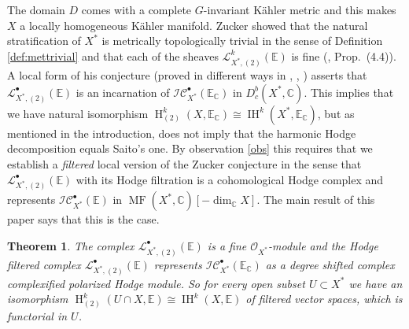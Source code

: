 \documentclass[12pt,letterpaper]{amsart}
\numberwithin{equation}{section}
\def\CC{{\mathbb C}}
\def\EE{{\mathbb E}}
\def\Iscr{{\mathscr I}}
\def\Lscr{{\mathscr L}}
\def\Ocal{{\mathcal O}}
\def\Cscr{{\mathscr C}}
\def\pt{{\scriptscriptstyle\bullet}}
\newcommand\Hl{\operatorname{H}}
\newcommand\IH{\operatorname{IH}}
\newcommand\MF{\operatorname{MF}}
\newtheorem{theorem}{Theorem}[section]
\theoremstyle{remark}
\begin{document}
 The domain  $D$ comes with a complete $G$-invariant K\"ahler metric and this makes 
$X$ a locally homogeneous  K\"ahler manifold. Zucker showed that the natural stratification of $X^*$ is metrically topologically trivial in the sense of Definition \ref{def:mettrivial} and  that each of the sheaves $\Lscr^k_{{X^*},(2)}(\EE)$ is fine (\cite{zucker:warped}, Prop.\ (4.4)). A local form of his conjecture 
(proved in different ways in \cite{looij:l2}, \cite{ss}, \cite{lr}) asserts that $\Lscr^\pt_{{X^*},(2)}(\EE)$ is an incarnation of  
$\Iscr\Cscr_{X^*}^\pt(\EE_\CC)$
in $D^b_c({X^*}, \CC)$. This implies that we have  natural isomorphism 
$\Hl^k_{(2)}(X, \EE_\CC)\cong \IH^k({X^*}, \EE_\CC)$, but as mentioned in the introduction, does not imply that 
the harmonic Hodge decomposition  equals Saito's one. 
By observation \ref{obs} this requires that we establish a \emph{filtered} local 
version of the Zucker conjecture in the sense that $\Lscr^\pt_{{X^*},(2)}(\EE)$ with its Hodge filtration is a 
cohomological Hodge complex and represents $\Iscr\Cscr^\pt_{X^*}(\EE)$ in $\MF(X^*,\CC)[-\dim_\CC X]$. The main result of this paper  says that this is the case.

\begin{theorem}\label{thm:main}
The complex $\Lscr^\pt_{{X^*},(2)}(\EE)$ is a fine $\Ocal_{X^*}$-module and  the Hodge filtered complex $\Lscr^\pt_{{X^*},(2)}(\EE)$ represents  $\Iscr\Cscr_{X^*}^\pt(\EE_\CC)$ as a degree shifted complex complexified  polarized Hodge module. So  for every open subset $U\subset X^*$ we have an isomorphism $\Hl_{(2)}^k(U\cap X, \EE)\cong \IH^k(X, \EE)$ of filtered vector spaces, which is functorial in $U$.
\end{theorem}
\end{document}
